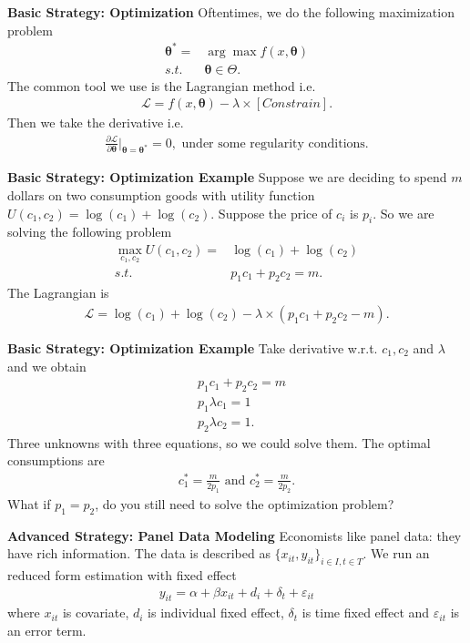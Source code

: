 \documentclass{beamer}
\begin{document}
\begin{frame}{\bf Basic Strategy: Optimization}
Oftentimes, we do the following maximization problem
\begin{align*}
\pmb{\theta}^*=&\arg \max f(x,\pmb{\theta}) \\
s.t.~~&\pmb{\theta}\in \Theta.
\end{align*}
The common tool we use is the Lagrangian method i.e.
\begin{align*}
\mathcal{L}=f(x,\pmb{\theta})-\lambda\times [Constrain].
\end{align*}
Then we take the derivative i.e.
\begin{align*}
\frac{\partial \mathcal{L}}{\partial \pmb{\theta}}|_{\pmb{\theta}=\pmb{\theta}^*}=0,\text{ under some regularity conditions.}
\end{align*}
\end{frame}

\begin{frame}{\bf Basic Strategy: Optimization Example}
Suppose we are deciding to spend $m$ dollars on two consumption goods with utility function $U(c_1,c_2)=\log(c_1)+\log(c_2)$. Suppose the price of $c_i$ is $p_i$. So we are solving the following problem
\begin{align*}
\max_{c_1,c_2} U(c_1,c_2)=&\log(c_1)+\log(c_2)\\
s.t.~&p_1c_1+p_2c_2=m.
\end{align*}
The Lagrangian is
\begin{align*}
\mathcal{L}=\log(c_1)+\log(c_2)-\lambda\times (p_1c_1+p_2c_2-m).
\end{align*}
\end{frame}

\begin{frame}{\bf Basic Strategy: Optimization Example}
Take derivative w.r.t. $c_1, c_2$ and $\lambda$ and we obtain
\begin{align*}
&p_1c_1+p_2c_2=m\\
&p_1\lambda c_1=1\\
&p_2\lambda c_2=1.
\end{align*}
Three unknowns with three equations, so we could solve them. The optimal consumptions are
\begin{align*}
c_1^*=\frac{m}{2p_1}\text{ and }c_2^*=\frac{m}{2p_2}.
\end{align*}
What if $p_1=p_2$, do you still need to solve the optimization problem?
\end{frame}

\begin{frame}{\bf Advanced Strategy: Panel Data Modeling}
Economists like panel data: they have rich information. The data is described as $\{x_{it},y_{it}\}_{i\in I, t\in T}.$ We run an reduced form estimation with fixed effect
\begin{align*}
y_{it}=\alpha +\beta x_{it}+d_i+\delta_t+\varepsilon_{it}
\end{align*}
where $x_{it}$ is covariate, $d_i$ is individual fixed effect, $\delta_t$ is time fixed effect and $\varepsilon_{it}$ is an error term.
\end{frame}
\end{document}
